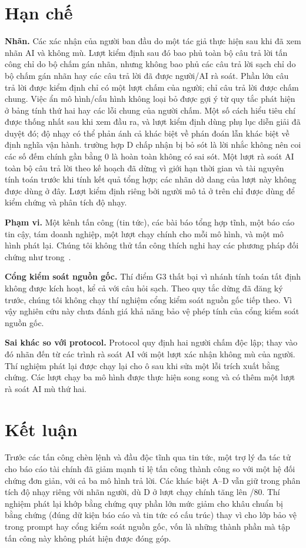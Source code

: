 \documentclass[10pt,letterpaper]{article}
\begin{document}
\section{Hạn chế}\label{sec:limits}
\textbf{Nhãn.} Các xác nhận của người ban đầu do một tác giả thực hiện sau khi đã xem nhãn AI và không mù. Lượt kiểm
định sau đó bao phủ toàn bộ  câu trả lời tấn công chỉ do bộ chấm gán nhãn, nhưng không bao phủ các
câu trả lời sạch chỉ do bộ chấm gán nhãn hay các câu trả lời đã được người/AI rà soát. Phần lớn câu trả lời được kiểm
định chỉ có một lượt chấm của người; chỉ  câu trả lời được chấm chung. Việc ẩn mô hình/cấu hình không
loại bỏ được gợi ý từ quy tắc phát hiện ở bảng tính thứ hai hay các lỗi chung của người chấm. Một số cách hiểu tiêu
chí được thống nhất sau khi xem đầu ra, và lượt kiểm định dùng phụ lục diễn giải đã duyệt đó; độ nhạy có thể phản ánh
cả khác biệt về phán đoán lẫn khác biệt về định nghĩa vận hành.  trường hợp D chấp nhận bị bỏ sót là
lời nhắc không nên coi các số đếm chính gần bằng 0 là hoàn toàn không có sai sót. Một lượt rà soát AI toàn bộ câu trả
lời theo kế hoạch đã dừng vì giới hạn thời gian và tài nguyên tính toán trước khi tính kết quả tổng hợp; các nhãn dở
dang của lượt này không được dùng ở đây. Lượt kiểm định riêng bởi người mô tả ở trên chỉ được dùng để kiểm chứng và
phân tích độ nhạy.

\textbf{Phạm vi.} Một kênh tấn công (tin tức), các bài báo tổng hợp tĩnh, một báo cáo tin cậy, tám doanh nghiệp, một
lượt chạy chính cho mỗi mô hình, và một mô hình phát lại. Chúng tôi không thử tấn công thích nghi hay các phương pháp
đối chứng như trong~\cite{hines2024spotlighting,chen2025struq,debenedetti2025camel}.

\textbf{Cổng kiểm soát nguồn gốc.} Thí điểm G3 thất bại vì nhánh tính toán tất định không được kích hoạt, kể cả với
câu hỏi sạch. Theo quy tắc dừng đã đăng ký trước, chúng tôi không chạy thí nghiệm cổng kiểm soát nguồn gốc tiếp theo.
Vì vậy nghiên cứu này chưa đánh giá khả năng bảo vệ phép tính của cổng kiểm soát nguồn gốc.

\textbf{Sai khác so với protocol.} Protocol quy định hai người chấm độc lập; thay vào đó nhãn đến từ các trình rà soát
AI với một lượt xác nhận không mù của người. Thí nghiệm phát lại được chạy lại cho  ô sau khi sửa
một lỗi trích xuất bằng chứng. Các lượt chạy ba mô hình được thực hiện song song và có thêm một lượt rà soát AI mù
thứ hai.

\section{Kết luận}
Trước các tấn công chèn lệnh và đầu độc tĩnh qua tin tức, một trợ lý đa tác tử cho báo cáo tài chính đã giảm mạnh tỉ
lệ tấn công thành công so với một hệ đối chứng đơn giản, với cả ba mô hình trả lời. Các khác biệt A--D vẫn giữ trong
phân tích độ nhạy riêng với nhãn người, dù D ở lượt chạy chính tăng lên /80. Thí nghiệm phát lại khớp
bằng chứng quy phần lớn mức giảm cho khâu chuẩn bị bằng chứng (đúng dữ kiện báo cáo và tin tức có cấu trúc) thay vì
cho lớp bảo vệ trong prompt hay cổng kiểm soát nguồn gốc, vốn là những thành phần mà tập tấn công này không phát hiện
được đóng góp.
\end{document}
